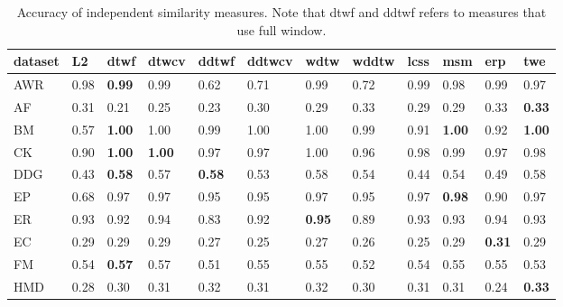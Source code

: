 \begin{table}
\centering
\caption{Accuracy of independent similarity measures. Note that dtwf and ddtwf refers to measures that use full window.}
\label{tbl:acc-indep}
\begin{tabular}{p{0.6cm}*{11}{p{0.55cm}}}
\toprule
dataset &            L2 &          dtwf &         dtwcv &         ddtwf &        ddtwcv &          wdtw &         wddtw &          lcss &           msm &           erp &           twe \\
\midrule
    AWR &          0.98 & \textbf{0.99} &          0.99 &          0.62 &          0.71 &          0.99 &          0.72 &          0.99 &          0.98 &          0.99 &          0.97 \\
     AF &          0.31 &          0.21 &          0.25 &          0.23 &          0.30 &          0.29 &          0.33 &          0.29 &          0.29 &          0.33 & \textbf{0.33} \\
     BM &          0.57 & \textbf{1.00} &          1.00 &          0.99 &          1.00 &          1.00 &          0.99 &          0.91 & \textbf{1.00} &          0.92 & \textbf{1.00} \\
     CK &          0.90 & \textbf{1.00} & \textbf{1.00} &          0.97 &          0.97 &          1.00 &          0.96 &          0.98 &          0.99 &          0.97 &          0.98 \\
    DDG &          0.43 & \textbf{0.58} &          0.57 & \textbf{0.58} &          0.53 &          0.58 &          0.54 &          0.44 &          0.54 &          0.49 &          0.58 \\
     EP &          0.68 &          0.97 &          0.97 &          0.95 &          0.95 &          0.97 &          0.95 &          0.97 & \textbf{0.98} &          0.90 &          0.97 \\
     ER &          0.93 &          0.92 &          0.94 &          0.83 &          0.92 & \textbf{0.95} &          0.89 &          0.93 &          0.93 &          0.94 &          0.93 \\
     EC &          0.29 &          0.29 &          0.29 &          0.27 &          0.25 &          0.27 &          0.26 &          0.25 &          0.29 & \textbf{0.31} &          0.29 \\
     FM &          0.54 & \textbf{0.57} &          0.57 &          0.51 &          0.55 &          0.55 &          0.52 &          0.54 &          0.55 &          0.55 &          0.53 \\
    HMD &          0.28 &          0.30 &          0.31 &          0.32 &          0.31 &          0.32 &          0.30 &          0.31 &          0.31 &          0.24 & \textbf{0.33} \\

\end{tabular}
\end{table}
